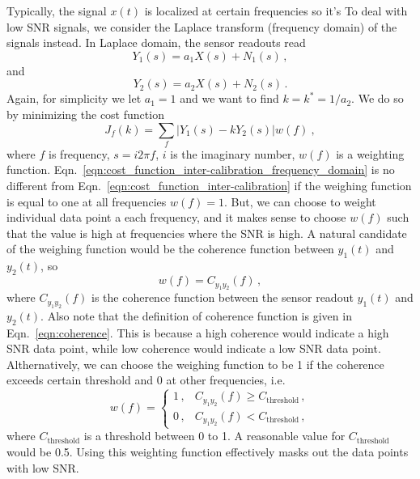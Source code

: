 Typically, the signal $x(t)$ is localized at certain frequencies so it's 
To deal with low SNR signals, we consider the Laplace transform (frequency domain) of the signals instead.
In Laplace domain, the sensor readouts read
\begin{equation}
	Y_1(s) = a_1X(s) + N_1(s)\,,
\end{equation}
and
\begin{equation}
	Y_2(s) = a_2X(s) + N_2(s)\,.
\end{equation}
Again, for simplicity we let $a_1 = 1$ and we want to find $k=k^*=1/a_2$.
We do so by minimizing the cost function
\begin{equation}
	\boxed{
		J_f (k) = \sum_{f} \left\lvert Y_1(s) - kY_2(s)\right\rvert w(f)
	}\ ,
	\label{eqn:cost_function_inter-calibration_frequency_domain}
\end{equation}
where $f$ is frequency, $s=i2\pi f$, $i$ is the imaginary number, $w(f)$ is a weighting function.
Eqn.~\eqref{eqn:cost_function_inter-calibration_frequency_domain} is no different from Eqn.~\eqref{eqn:cost_function_inter-calibration} if the weighing function is equal to one at all frequencies $w(f)=1$.
But, we can choose to weight individual data point a each frequency, and it makes sense to choose $w(f)$ such that the value is high at frequencies where the SNR is high.
A natural candidate of the weighing function would be the coherence function between $y_1(t)$ and $y_2(t)$, so
\begin{equation}
	\boxed{
		w(f) = C_{y_1y_2}(f)\,,
}
\end{equation}
 where $C_{y_1y_2}(f)$ is the coherence function between the sensor readout $y_1(t)$ and $y_2(t)$.
 Also note that the definition of coherence function is given in Eqn.~\eqref{eqn:coherence}.
 This is because a high coherence would indicate a high SNR data point, while low coherence would indicate a low SNR data point.
 Althernatively, we can choose the weighing function to be 1 if the coherence exceeds certain threshold and 0 at other frequencies, i.e.
 \begin{equation}
 	\boxed{
 		w(f) =
 		\begin{cases}
 			1\,, & C_{y_1y_2}(f) \geq C_\mathrm{threshold}\,, \\
 			0\,, & C_{y_1y_2}(f) < C_\mathrm{threshold}\,,
 		\end{cases}
 }
 \end{equation}
where $C_\mathrm{threshold}$ is a threshold between 0 to 1.
A reasonable value for $C_\mathrm{threshold}$ would be 0.5.
Using this weighting function effectively masks out the data points with low SNR.
 
